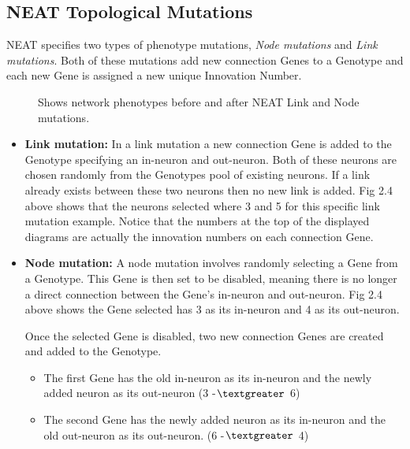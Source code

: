 \documentclass[]{Learning-to-Play-Wolfenstein-thesis}
\begin{document}
\subsection{NEAT Topological Mutations}
NEAT specifies two types of phenotype mutations, \textit{Node mutations} and \textit{Link mutations}. Both of these mutations add new connection Genes to a Genotype and each new Gene is assigned a new unique Innovation Number. ~\cite{NEAT:topmut}
\begin{figure}[h]
\centering
\fboxsep 2mm
\caption{\label{fig:NEAT_mutations} Shows network phenotypes before and after NEAT Link and Node mutations.}
\end{figure} 
\begin{itemize}
\item\textbf{Link mutation:} In a link mutation a new connection Gene is added to the Genotype specifying an in-neuron and out-neuron. Both of these neurons are chosen randomly from the Genotypes pool of existing neurons. If a link already exists between these two neurons then no new link is added. Fig 2.4 above shows that the neurons selected where 3 and 5 for this specific link mutation example. Notice that the numbers at the top of the displayed diagrams are actually the innovation numbers on each connection Gene.
\item\textbf{Node mutation:} A node mutation involves randomly selecting a Gene from a Genotype. This Gene is then set to be disabled, meaning there is no longer a direct connection between the Gene's in-neuron and out-neuron. Fig 2.4 above shows the Gene selected has 3 as its in-neuron and 4 as its out-neuron. 

Once the selected Gene is disabled, two new connection Genes are created and added to the Genotype.
\begin{itemize}
\item The first Gene has the old in-neuron as its in-neuron and the newly added neuron as its out-neuron (3 -{$\textgreater$} 6)
\item The second Gene has the newly added neuron as its in-neuron and the old out-neuron as its out-neuron. (6 -{$\textgreater$} 4)
\end{itemize}
\end{itemize}
\end{document}
